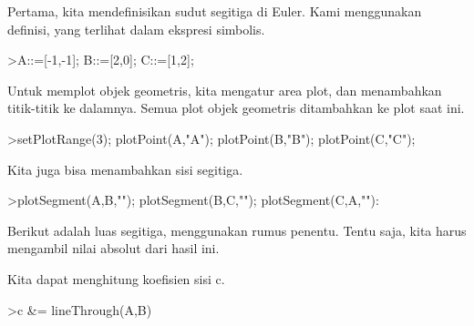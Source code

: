 \documentclass[a4paper,10pt]{article}
\begin{document}
\begin{eulernotebook}
\begin{eulercomment}
\begin{eulercomment}
\begin{eulercomment}
\begin{eulercomment}
\begin{eulercomment}
\begin{eulercomment}
\begin{eulercomment}
\begin{eulercomment}
\begin{eulercomment}
\begin{eulercomment}
\begin{eulercomment}
\begin{eulercomment}
\begin{eulercomment}
\begin{eulercomment}
\begin{eulercomment}
\begin{eulercomment}
\begin{eulercomment}
\begin{eulercomment}
\begin{eulercomment}
\begin{eulercomment}
\begin{eulercomment}
\begin{eulercomment}
\begin{eulercomment}
\begin{eulercomment}
\begin{eulercomment}
\begin{eulercomment}
\begin{eulercomment}
\begin{eulercomment}
\begin{eulercomment}
\begin{eulercomment}
\begin{eulercomment}
\begin{eulercomment}
\begin{eulercomment}
\begin{eulercomment}
\begin{eulercomment}
\begin{eulercomment}
\begin{eulercomment}
\begin{eulercomment}
\begin{eulercomment}
Pertama, kita mendefinisikan sudut segitiga di Euler. Kami menggunakan
definisi, yang terlihat dalam ekspresi simbolis.
\end{eulercomment}
\begin{eulerprompt}
>A::=[-1,-1]; B::=[2,0]; C::=[1,2];
\end{eulerprompt}
\begin{eulercomment}
Untuk memplot objek geometris, kita mengatur area plot, dan
menambahkan titik-titik ke dalamnya. Semua plot objek geometris
ditambahkan ke plot saat ini.
\end{eulercomment}
\begin{eulerprompt}
>setPlotRange(3); plotPoint(A,"A"); plotPoint(B,"B"); plotPoint(C,"C");
\end{eulerprompt}
\begin{eulercomment}
Kita juga bisa menambahkan sisi segitiga.
\end{eulercomment}
\begin{eulerprompt}
>plotSegment(A,B,""); plotSegment(B,C,""); plotSegment(C,A,""):
\end{eulerprompt}
\begin{eulercomment}
Berikut adalah luas segitiga, menggunakan rumus penentu. Tentu saja,
kita harus mengambil nilai absolut dari hasil ini.
\end{eulercomment}
\begin{eulercomment}
Kita dapat menghitung koefisien sisi c.
\end{eulercomment}
\begin{eulerprompt}
>c &= lineThrough(A,B)

\end{eulerprompt}
\end{eulercomment}
\end{eulercomment}
\end{eulercomment}
\end{eulercomment}
\end{eulercomment}
\end{eulercomment}
\end{eulercomment}
\end{eulercomment}
\end{eulercomment}
\end{eulercomment}
\end{eulercomment}
\end{eulercomment}
\end{eulercomment}
\end{eulercomment}
\end{eulercomment}
\end{eulercomment}
\end{eulercomment}
\end{eulercomment}
\end{eulercomment}
\end{eulercomment}
\end{eulercomment}
\end{eulercomment}
\end{eulercomment}
\end{eulercomment}
\end{eulercomment}
\end{eulercomment}
\end{eulercomment}
\end{eulercomment}
\end{eulercomment}
\end{eulercomment}
\end{eulercomment}
\end{eulercomment}
\end{eulercomment}
\end{eulercomment}
\end{eulercomment}
\end{eulercomment}
\end{eulercomment}
\end{eulercomment}
\end{eulernotebook}
\end{document}

